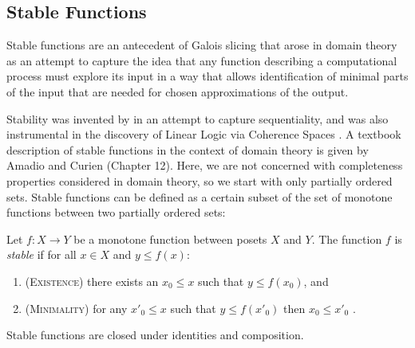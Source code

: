 \subsection{Stable Functions}
\label{sec:stable-functions}

Stable functions are an antecedent of Galois slicing that arose in
domain theory as an attempt to capture the idea that any function
describing a computational process must explore its input in a way
that allows identification of minimal parts of the input that are
needed for chosen approximations of the output.

Stability was invented by \citet{berry79} in an attempt to capture
sequentiality, and was also instrumental in the discovery of Linear
Logic via Coherence Spaces \cite{girard}. A textbook description of
stable functions in the context of domain theory is given by Amadio
and Curien \cite{amadio-curien} (Chapter 12). Here, we are not
concerned with completeness properties considered in domain theory, so
we start with only partially ordered sets. Stable functions can be
defined as a certain subset of the set of monotone functions between
two partially ordered sets:

\begin{definition}
  Let $f : X \to Y$ be a monotone function between posets $X$ and
  $Y$. The function $f$ is \emph{stable} if for all $x \in X$ and
  $y \leq f(x)$:
  \begin{enumerate}
  \item (\textsc{Existence}) there exists an $x_0 \leq x$ such that $y \leq f(x_0)$, and
  \item (\textsc{Minimality}) for any $x'_0 \leq x$ such that $y \leq f(x'_0)$ then
    $x_0 \leq x'_0$ .
  \end{enumerate}
\end{definition}

\begin{lemma}
  Stable functions are closed under identities and composition.
\end{lemma}

